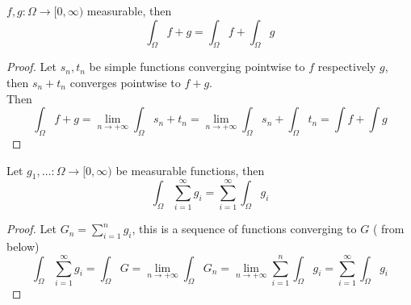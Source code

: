 \documentclass[../main.tex]{subfiles}
\begin{document}
\begin{crly}
$f,g:\Omega \to [ 0, \infty ) $ measurable, then
\[ 
\int_\Omega f+g = \int_\Omega f + \int_\Omega g
\]

\end{crly}
\begin{proof}
Let $s_n, t_n$ be simple functions converging pointwise to $f$ respectively $g$, then $s_n+t_n$ converges pointwise to $f+g$.\\
Then
\[ 
\int_{ \Omega }^{  } f+g = \lim_{n \to  + \infty} \int_{\Omega} s_n+t_n = \lim_{n \to  + \infty} \int_{ \Omega }^{  } s_n + \int_{ \Omega }^{  }t_n = \int f + \int g	
\]
\end{proof}
\begin{crly}
Let $g_1,\ldots: \Omega\to [ 0, \infty ) $ be measurable functions, then
\[ 
\int_\Omega \sum_{i=1}^{ \infty } g_i = \sum_{i=1}^{ \infty } \int_{ \Omega }^{  }g_i
\]

\end{crly}
\begin{proof}
Let $G_n = \sum_{i=1}^{ n} g_i$, this is a sequence of functions converging to $G$ ( from below) 
\[ 
\int_{ \Omega }^{  } \sum_{i=1}^{ \infty } g_i = \int_{ \Omega }^{  } G = \lim_{n \to  + \infty} \int_{ \Omega }^{  }G_n = \lim_{n  \to  + \infty} \sum_{i=1}^{ n} \int_\Omega g_i = \sum_{i=1}^{ \infty } \int_\Omega g_i			
\]

\end{proof}
\end{document}
